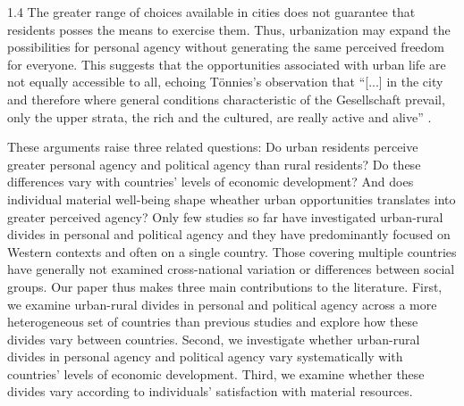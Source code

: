 \documentclass[10pt, letterpaper]{article}
\begin{document}
\begin{spacing}{1.4}
The greater range of choices available in cities does not guarantee that residents posses the means to exercise them. Thus, urbanization may expand the possibilities for personal agency without generating the same perceived freedom for everyone.
This suggests that the opportunities associated with urban life are not equally accessible to all, echoing T\"{o}nnies's observation that ``[...] in the city and therefore where general conditions characteristic of the Gesellschaft prevail, only the upper strata, the rich and the cultured, are really active and alive'' \citep[p. 227]{tonnies57}.

These arguments raise three related questions: Do urban residents perceive greater personal agency and political agency than rural residents? Do these differences vary with countries' levels of economic development? And does individual material well-being shape wheather urban opportunities translates into greater perceived agency? %
Only few studies so far have investigated urban-rural divides in personal and
political agency and they have predominantly focused on Western contexts and
often on a single country. Those covering multiple countries have generally not
examined cross-national variation or differences between social groups. Our
paper thus makes three main contributions to the literature. First, we examine
urban-rural divides in personal and political agency across a more heterogeneous
set of countries than previous studies and explore how these divides vary
between countries. Second, we investigate whether urban-rural divides in
personal agency and political agency vary systematically with countries' levels
of economic development. Third, we examine whether these divides vary according
to individuals' satisfaction with material resources.




\end{spacing}
\end{document}
